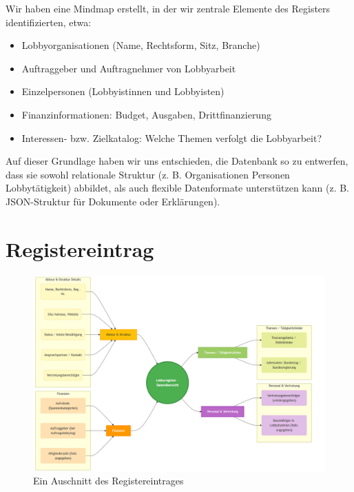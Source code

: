 \documentclass[12pt,twoside=false,a4paper,parskip]{scrbook}
\begin{document}
Wir haben eine Mindmap erstellt, in der wir zentrale Elemente des Registers identifizierten, etwa:

\begin{itemize}
  \item Lobbyorganisationen (Name, Rechtsform, Sitz, Branche)  
  \item Auftraggeber und Auftragnehmer von Lobbyarbeit  
  \item Einzelpersonen (Lobbyistinnen und Lobbyisten)  

  \item Finanzinformationen: Budget, Ausgaben, Drittfinanzierung  
  \item Interessen- bzw. Zielkatalog: Welche Themen verfolgt die Lobbyarbeit?  
\end{itemize}

Auf dieser Grundlage haben wir uns entschieden, die Datenbank so zu entwerfen, dass sie sowohl relationale Struktur (z. B. Organisationen Personen Lobbytätigkeit) abbildet, als auch flexible Datenformate unterstützen kann (z. B. JSON-Struktur für Dokumente oder Erklärungen).
\section*{Registereintrag}


\begin{figure}[h]
    \centering
    \includegraphics[width=1\textwidth]{overview.png} %
    \caption{Ein Auschnitt des Registereintrages}
    \label{fig:example}
\end{figure}


\newpage
\end{document}
